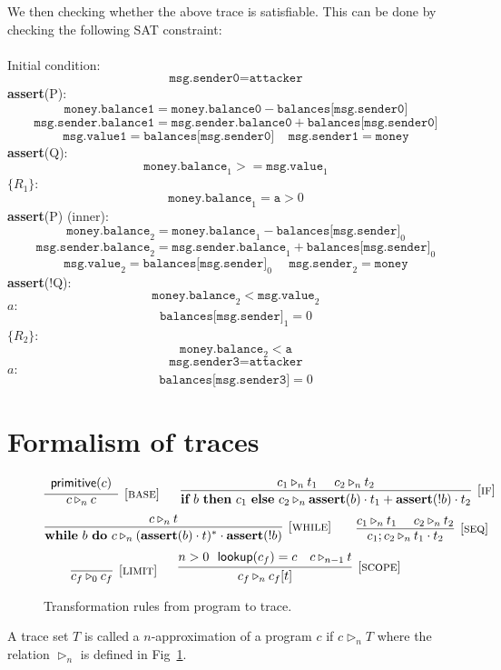 \documentclass[runningheads]{llncs}
\newcommand{\ifs}[3]{\textbf{if}~#1~\textbf{then}~#2~\textbf{else}~#3}
\newcommand{\whiles}[2]{\textbf{while}~#1~\textbf{do}~#2}
\newcommand{\trans}{\triangleright}
\newcommand{\rname}[1]{\textsc{#1}}
\begin{document}
We then checking whether the above trace is satisfiable. This can be done by checking the following SAT constraint:
\\
\\
Initial condition:
$$
\texttt{msg.sender0} = \texttt{attacker}
$$
\textbf{assert}(P):
$$
\texttt{money.balance1} = \texttt{money.balance0} - \texttt{balances[msg.sender0]}
$$
$$
\texttt{msg.sender.balance1} =  \texttt{msg.sender.balance0} + \texttt{balances[msg.sender0]}
$$
$$
\texttt{msg.value1} = \texttt{balances[msg.sender0]}
~~~~~
\texttt{msg.sender1} = \texttt{money}
$$
\textbf{assert}(Q):
$$
\texttt{money.balance}_1 >= \texttt{msg.value}_1
$$
$\{R_1\}$:
$$
\texttt{money.balance}_1 = \texttt{a}  > 0
$$
\textbf{assert}(P) (inner):
$$
\texttt{money.balance}_2 = \texttt{money.balance}_1 - \texttt{balances[msg.sender]}_0
$$
$$
\texttt{msg.sender.balance}_2 =  \texttt{msg.sender.balance}_1 + \texttt{balances[msg.sender]}_0
$$
$$
\texttt{msg.value}_2 = \texttt{balances[msg.sender]}_0~~~~~~
\texttt{msg.sender}_2 = \texttt{money}
$$
\textbf{assert}(!Q):
$$
\texttt{money.balance}_2 < \texttt{msg.value}_2
$$
$a:$
$$
\texttt{balances[msg.sender]}_1 = 0
$$
$\{R_2\}$:
$$
\texttt{money.balance}_2 < \texttt{a}
$$
$$
\texttt{msg.sender3} = \texttt{attacker}
$$
$a:$
$$
\texttt{balances[msg.sender3]} = 0
$$



\section{Formalism of traces}

\begin{figure}[t]
$$
\infer[{[\rname{base}]}]{c \trans_{n} c}{
	\begin{array}{c}
	\textsf{primitive}(c)
	\end{array}}
~~~~~
\infer[{[\rname{if}]}]{\ifs{b}{c_1}{c_2} \trans_{n} \textbf{assert}(b) \cdot t_1+\textbf{assert}(!b) \cdot t_2}{c_1 \trans_{n} t_1~~~~ c_2 \trans_{n} t_2}
$$
$$
\infer[{[\rname{while}]}]{\whiles{b}{c} \trans_{n} (\textbf{assert}(b) \cdot t)^* \cdot \textbf{assert}(!b)}{c \trans_{n} t}
~~~~~~
\infer[{[\rname{seq}]}]{c_1;c_2 \trans_{n} t_1 \cdot t_2}{c_1 \trans_{n} t_1~~~~ c_2 \trans_{n} t_2}
$$
$$
\infer[{[\rname{limit}]}]{c_f \trans_{0} c_f}{}~~~~~
\infer[{[\rname{scope}]}]{c_f \trans_{n} c_f[t]}{n > 0~~\textsf{lookup}(c_f) = c~~~c \trans_{n-1} t}
$$	
\caption{Transformation rules from program to trace.}\label{fig:transform}
\end{figure}

\begin{definition}
A trace set $T$ is called a $n$-approximation of a program $c$ if $c\triangleright_{n}T$ where the relation $\triangleright_{n}$ is defined in Fig~\ref{fig:transform}.
\end{definition}
\end{document}
